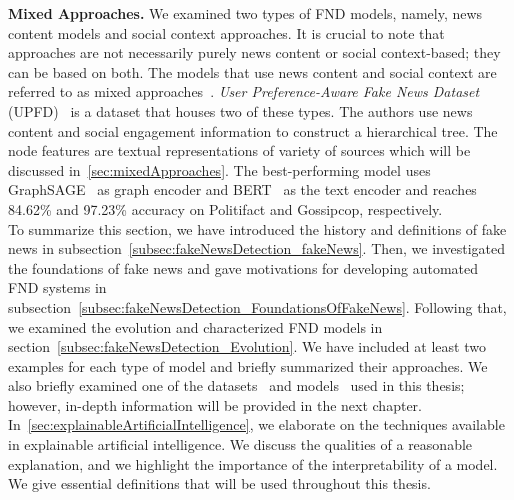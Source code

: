 \textbf{Mixed Approaches.} We examined two types of FND models, namely,  news content models and social context approaches. It is crucial to note that approaches are not necessarily purely news content or social context-based; they can be based on both. The models that use news content and social context are referred to as mixed approaches~\parencite{GraphNeuralNetworksWithContinualLearningFakeNewsDetection_Han}. \emph{User Preference-Aware Fake News Dataset} (UPFD)~\parencite{UPFD_Dataset_Shu} is a dataset that houses two of these types. The authors use news content and social engagement information to construct a hierarchical tree. The node features are textual representations of variety of sources which will be discussed in~\ref{sec:mixedApproaches}. The best-performing model uses GraphSAGE~\parencite{GraphSAGE_Hamilton} as graph encoder and BERT~\parencite{BERT_Devlin} as the text encoder and reaches 84.62\% and 97.23\% accuracy on Politifact and Gossipcop, respectively.\\
To summarize this section, we have introduced the history and definitions of fake news in subsection~\ref{subsec:fakeNewsDetection_fakeNews}. Then, we investigated the foundations of fake news and gave motivations for developing automated FND systems in subsection~\ref{subsec:fakeNewsDetection_FoundationsOfFakeNews}. Following that, we examined the evolution and characterized FND models in section~\ref{subsec:fakeNewsDetection_Evolution}. We have included at least two examples for each type of model and briefly summarized their approaches. We also briefly examined one of the datasets~\parencite{UPFD_Dataset_Shu} and models~\parencite{GraphSAGE_Hamilton} used in this thesis; however, in-depth information will be provided in the next chapter.\\
In~\ref{sec:explainableArtificialIntelligence}, we elaborate on the techniques available in explainable artificial intelligence. We discuss the qualities of a reasonable explanation, and we highlight the importance of the interpretability of a model. We give essential definitions that will be used throughout this thesis.

